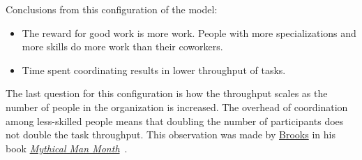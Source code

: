 \begin{samepage}
Conclusions from this configuration of the model:
\begin{itemize}
    \item The reward for good work is more work. People with more specializations and more skills do more work than their coworkers.
    \item Time spent coordinating results in lower throughput of tasks.
\end{itemize}
\end{samepage}

The last question for this configuration is how the throughput scales as the number of people in the organization is increased.
The overhead of coordination among less-skilled people means that doubling the number of participants does not double the task throughput. This observation was made by 
\href{https://en.wikipedia.org/wiki/Fred_Brooks}{Brooks} in his book 
%
\href{https://en.wikipedia.org/wiki/The_Mythical_Man-Month}{\textit{Mythical Man Month}}~\cite{1975_brooks}. 

